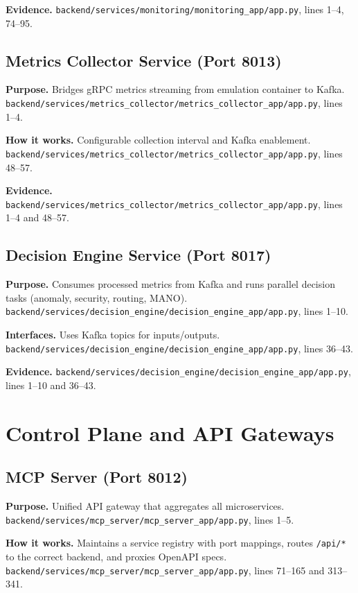 \documentclass[conference]{IEEEtran}
\begin{document}
\textbf{Evidence.} \texttt{backend/services/monitoring/monitoring\_app/app.py}, lines 1--4, 74--95.

\subsection{Metrics Collector Service (Port 8013)}
\textbf{Purpose.} Bridges gRPC metrics streaming from emulation container to Kafka. \texttt{backend/services/metrics\_collector/metrics\_collector\_app/app.py}, lines 1--4.

\textbf{How it works.} Configurable collection interval and Kafka enablement. \texttt{backend/services/metrics\_collector/metrics\_collector\_app/app.py}, lines 48--57.

\textbf{Evidence.} \texttt{backend/services/metrics\_collector/metrics\_collector\_app/app.py}, lines 1--4 and 48--57.

\subsection{Decision Engine Service (Port 8017)}
\textbf{Purpose.} Consumes processed metrics from Kafka and runs parallel decision tasks (anomaly, security, routing, MANO). \texttt{backend/services/decision\_engine/decision\_engine\_app/app.py}, lines 1--10.

\textbf{Interfaces.} Uses Kafka topics for inputs/outputs. \texttt{backend/services/decision\_engine/decision\_engine\_app/app.py}, lines 36--43.

\textbf{Evidence.} \texttt{backend/services/decision\_engine/decision\_engine\_app/app.py}, lines 1--10 and 36--43.

\section{Control Plane and API Gateways}

\subsection{MCP Server (Port 8012)}
\textbf{Purpose.} Unified API gateway that aggregates all microservices. \texttt{backend/services/mcp\_server/mcp\_server\_app/app.py}, lines 1--5.

\textbf{How it works.} Maintains a service registry with port mappings, routes \texttt{/api/*} to the correct backend, and proxies OpenAPI specs. \texttt{backend/services/mcp\_server/mcp\_server\_app/app.py}, lines 71--165 and 313--341.
\end{document}
